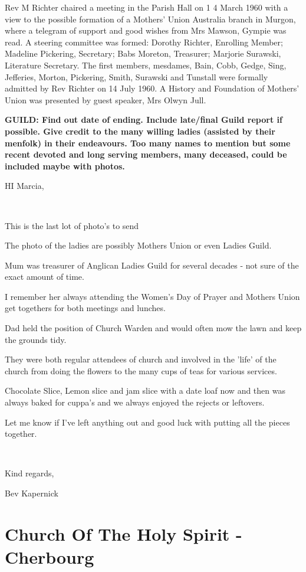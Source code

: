 Rev M Richter chaired a meeting in the Parish Hall on 1 4 March 1960 with a view to the possible formation of a Mothers' Union Australia branch in Murgon, where a telegram of support and good wishes from Mrs Mawson, Gympie was read. A steering committee was formed: Dorothy Richter, Enrolling Member; Madeline Pickering, Secretary; Babs Moreton, Treasurer; Marjorie Surawski, Literature Secretary. The first members, mesdames, Bain, Cobb, Gedge, Sing, Jefferies, Morton, Pickering, Smith, Surawski and Tunstall were formally admitted by Rev Richter on 14 July 1960. A History and Foundation of Mothers' Union was presented by guest speaker, Mrs Olwyn Jull.

\textbf{GUILD: Find out date of ending. Include late/final Guild report if possible. Give credit to the many willing ladies (assisted by their menfolk) in their endeavours. Too many names to mention but some recent devoted and long serving members, many deceased, could be included maybe with photos.}

HI Marcia,

~

This is the last lot of photo's to send

The photo of the ladies are possibly Mothers Union or even Ladies Guild.

Mum was treasurer of Anglican Ladies Guild for several decades - not sure of the exact amount of time.

I remember her always attending the Women's Day of Prayer and Mothers Union get togethers for both meetings and lunches.

Dad held the position of Church Warden and would often mow the lawn and keep the grounds tidy.

They were both regular attendees of church and involved in the 'life' of the church from doing the flowers to the many cups of teas for various services.

Chocolate Slice, Lemon slice and jam slice with a date loaf now and then was always baked for cuppa's and we always enjoyed the rejects or leftovers.

Let me know if I've left anything out and good luck with putting all the pieces together.

~

Kind regards,

Bev Kapernick

\hypertarget{church-of-the-holy-spirit---cherbourg}{%
\section{Church Of The Holy Spirit - Cherbourg}\label{church-of-the-holy-spirit---cherbourg}}

